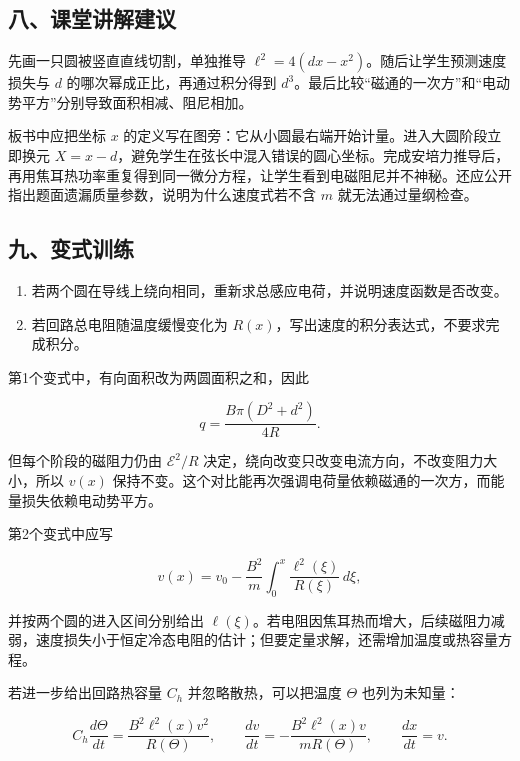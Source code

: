 \documentclass[12pt,a4paper,UTF8]{ctexart}
\newcommand{\tightlist}{\setlength{\itemsep}{0pt}\setlength{\parskip}{0pt}}
\begin{document}
\subsection{八、课堂讲解建议}\label{ux516bux8bfeux5802ux8bb2ux89e3ux5efaux8bae-3}

先画一只圆被竖直直线切割，单独推导
\(\ell^2=4(dx-x^2)\)。随后让学生预测速度损失与 \(d\)
的哪次幂成正比，再通过积分得到
\(d^3\)。最后比较``磁通的一次方''和``电动势平方''分别导致面积相减、阻尼相加。

板书中应把坐标 \(x\)
的定义写在图旁：它从小圆最右端开始计量。进入大圆阶段立即换元
\(X=x-d\)，避免学生在弦长中混入错误的圆心坐标。完成安培力推导后，再用焦耳热功率重复得到同一微分方程，让学生看到电磁阻尼并不神秘。还应公开指出题面遗漏质量参数，说明为什么速度式若不含
\(m\) 就无法通过量纲检查。

\subsection{九、变式训练}\label{ux4e5dux53d8ux5f0fux8badux7ec3-3}

\begin{enumerate}
\def\labelenumi{\arabic{enumi}.}
\tightlist
\item
  若两个圆在导线上绕向相同，重新求总感应电荷，并说明速度函数是否改变。
\item
  若回路总电阻随温度缓慢变化为
  \(R(x)\)，写出速度的积分表达式，不要求完成积分。
\end{enumerate}

第1个变式中，有向面积改为两圆面积之和，因此

\[
q=\frac{B\pi(D^2+d^2)}{4R}.
\]

但每个阶段的磁阻力仍由 \(\mathcal E^2/R\)
决定，绕向改变只改变电流方向，不改变阻力大小，所以 \(v(x)\)
保持不变。这个对比能再次强调电荷量依赖磁通的一次方，而能量损失依赖电动势平方。

第2个变式中应写

\[
v(x)=v_0-\frac{B^2}{m}
\int_0^x\frac{\ell^2(\xi)}{R(\xi)}\,d\xi,
\]

并按两个圆的进入区间分别给出
\(\ell(\xi)\)。若电阻因焦耳热而增大，后续磁阻力减弱，速度损失小于恒定冷态电阻的估计；但要定量求解，还需增加温度或热容量方程。

若进一步给出回路热容量 \(C_h\) 并忽略散热，可以把温度 \(\Theta\)
也列为未知量：

\[C_h\frac{d\Theta}{dt}=\frac{B^2\ell^2(x)v^2}{R(\Theta)},\qquad \frac{dv}{dt}=-\frac{B^2\ell^2(x)v}{mR(\Theta)},\qquad \frac{dx}{dt}=v.\]
\end{document}
